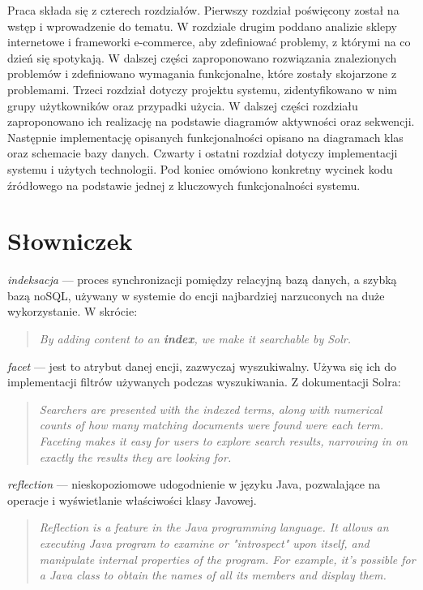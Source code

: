 Praca składa się z czterech rozdziałów. Pierwszy rozdział poświęcony został na wstęp i wprowadzenie do tematu. W rozdziale drugim poddano analizie sklepy internetowe i frameworki e-commerce, aby zdefiniować problemy, z którymi na co dzień się spotykają. W dalszej części zaproponowano rozwiązania znalezionych problemów i zdefiniowano wymagania funkcjonalne, które zostały skojarzone z problemami. Trzeci rozdział dotyczy projektu systemu, zidentyfikowano w nim grupy użytkowników oraz przypadki użycia. W dalszej części rozdziału zaproponowano ich realizację na podstawie diagramów aktywności oraz sekwencji. Następnie implementację opisanych funkcjonalności opisano na diagramach klas oraz schemacie bazy danych. Czwarty i ostatni rozdział dotyczy implementacji systemu i użytych technologii. Pod koniec omówiono konkretny wycinek kodu źródłowego na podstawie jednej z kluczowych funkcjonalności systemu. 
 
\newpage
\section{Słowniczek}
\noindent
\textit{indeksacja} — proces synchronizacji pomiędzy relacyjną bazą danych, a szybką bazą noSQL, używany w systemie do encji najbardziej narzuconych na duże wykorzystanie. W skrócie: 
\begin{quote}
	\textit{By adding content to an \textbf{index}, we make it searchable by Solr.}\cite{Solr-doc} 
\end{quote}

\noindent
\textit{facet} — jest to atrybut danej encji, zazwyczaj wyszukiwalny. Używa się ich do implementacji filtrów używanych podczas wyszukiwania. Z dokumentacji Solra:
\begin{quote} \textit{
	Searchers are presented with the indexed terms, along with numerical counts of how many matching documents were found were each term. Faceting makes it easy for users to explore search results, narrowing in on exactly the results they are looking for.
	}\cite{Solr-doc}
\end{quote}

\noindent
\textit{reflection} — nieskopoziomowe udogodnienie w języku Java, pozwalające na operacje i wyświetlanie właściwości klasy Javowej.
\begin{quote} \textit{
		Reflection is a feature in the Java programming language. It allows an executing Java program to examine or "introspect" upon itself, and manipulate internal properties of the program. For example, it's possible for a Java class to obtain the names of all its members and display them.
	}\cite{oracle}
\end{quote}




